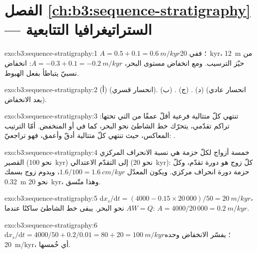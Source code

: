 \section*{الفصل \ref{ch:b3:sequence-stratigraphy} --- الستراتيغرافيا التتابعية}

\begin{solution}{exo:b3:sequence-stratigraphy:1}
$A = 0.5 + 0.1 = \qty{0.6}{m/kyr}$؛ ففي \qty{20}{kyr}،
\qty{12}{m} من حيّز الترسيب. ومع انخفاض مستوى البحر، $A = -0.3 + 0.1 = \qty{-0.2}{m/kyr}$: انخفاض
نسبيّ يتباطأ بفعل الهبوط.
\end{solution}

\begin{solution}{exo:b3:sequence-stratigraphy:2}
(أ)  (انحسار قسري). (ب) . (ج)
. (د)  (انحسار عادي بعد الانخفاض).
\end{solution}

\begin{solution}{exo:b3:sequence-stratigraphy:3}
تنتهي كلّ متتالية فرعية أقلّ عمقًا من التي تحتها: تراكم تقدّمي،
يتحرّك خط الشاطئ نحو البحر، كما في  أو المنخفض. أمّا
الترتيب المعاكس، حيث تنتهي كلّ متتالية أدقّ وأعمق، فهو تراجعيّ:
.
\end{solution}

\begin{solution}{exo:b3:sequence-stratigraphy:4}
خمسة أزواج لكلّ حزمة هي نسبة الانحراف المركزي القصير (نحو
\qty{100}{kyr}) إلى التقدّم الاعتدالي (نحو \qty{20}{kyr}): كلّ زوج هو دورة تقدّم،
وكلّ حزمة دورة انحراف مركزي. ويكون المعدّل
$1.6/100 = \qty{1.6}{cm/kyr}$، ويدوم زوج بسمك \qty{0.32}{m} نحو
\qty{20}{kyr}، وهذا متّسق.
\end{solution}

\begin{solution}{exo:b3:sequence-stratigraphy:5}
$\mathrm dx_s/\mathrm dt = (4000 - 0.15\times20\,000)/50 = \qty{20}{m/kyr}$،
نحو البحر. يبقى خط الشاطئ ساكنًا عندما $AW = Q$: $A = 4000/20\,000 =
\qty{0.2}{m/kyr}$.
\end{solution}

\begin{solution}{exo:b3:sequence-stratigraphy:6}
$\mathrm dx_s/\mathrm dt = 4000/50 + 0.2/0.01 = 80 + 20 = \qty{100}{m/kyr}$؛
يفسّر الانخفاض وحده \qty{20}{m/kyr}، أي خُمسها.
\end{solution}

